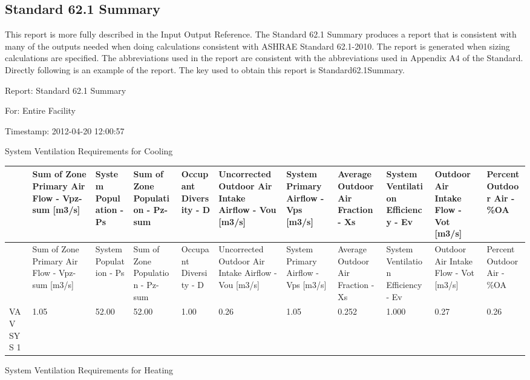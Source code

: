 \subsection{Standard 62.1 Summary}\label{standard-62.1-summary}

This report is more fully described in the Input Output Reference. The Standard 62.1 Summary produces a report that is consistent with many of the outputs needed when doing calculations consistent with ASHRAE Standard 62.1-2010. The report is generated when sizing calculations are specified. The abbreviations used in the report are consistent with the abbreviations used in Appendix A4 of the Standard. Directly following is an example of the report. The key used to obtain this report is Standard62.1Summary.

Report: Standard 62.1 Summary

For: Entire Facility

Timestamp: 2012-04-20 12:00:57

System Ventilation Requirements for Cooling

{\scriptsize
\begin{longtable}[c]{>{\raggedright}p{0.54in}>{\raggedright}p{0.54in}>{\raggedright}p{0.54in}>{\raggedright}p{0.54in}>{\raggedright}p{0.54in}>{\raggedright}p{0.54in}>{\raggedright}p{0.54in}>{\raggedright}p{0.54in}>{\raggedright}p{0.54in}>{\raggedright}p{0.54in}>{\raggedright}p{0.54in}}
\toprule 
 & Sum of Zone Primary Air Flow - Vpz-sum [m3/s] & System Population - Ps & Sum of Zone Population - Pz-sum & Occupant Diversity - D & Uncorrected Outdoor Air Intake Airflow - Vou [m3/s] & System Primary Airflow - Vps [m3/s] & Average Outdoor Air Fraction - Xs & System Ventilation Efficiency - Ev & Outdoor Air Intake Flow - Vot [m3/s] & Percent Outdoor Air - \%OA \tabularnewline
\midrule
\endfirsthead

\toprule 
 & Sum of Zone Primary Air Flow - Vpz-sum [m3/s] & System Population - Ps & Sum of Zone Population - Pz-sum & Occupant Diversity - D & Uncorrected Outdoor Air Intake Airflow - Vou [m3/s] & System Primary Airflow - Vps [m3/s] & Average Outdoor Air Fraction - Xs & System Ventilation Efficiency - Ev & Outdoor Air Intake Flow - Vot [m3/s] & Percent Outdoor Air - \%OA \tabularnewline
\midrule
\endhead

VAV SYS 1 & 1.05 & 52.00 & 52.00 & 1.00 & 0.26 & 1.05 & 0.252 & 1.000 & 0.27 & 0.26 \tabularnewline
\bottomrule
\end{longtable}}

System Ventilation Requirements for Heating

